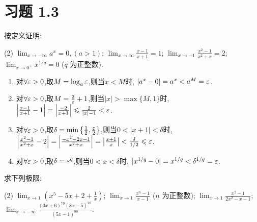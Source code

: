 \section*{习题 1.3}

\begin{exercise}[1.3.1]\label{exe:1.3.1}
    按定义证明:
    \begin{tasks}[label=(\arabic*)](2)
        \task $\lim_{x \to -\infty} a^x = 0, (a > 1)$;
        \task $\lim_{x \to \infty} \frac{x-1}{x+1} = 1$;
        \task $\lim_{x \to -1} \frac{x^2-1}{x^2+x} = 2$;
        \task $\lim_{x \to 0^+} x^{1/q} = 0$ ($q$ 为正整数).
    \end{tasks}
\end{exercise}

\begin{solution}
    \begin{enumerate}[(1)]
        \item 对$\forall \varepsilon > 0$,取$M = \log_a \varepsilon$,则当$x < M$时, $|a^x - 0| = a^x < a^M = \varepsilon$.
        \item 对$\forall \varepsilon > 0$,取$M = \frac{2}{\varepsilon}+1$,则当$|x| > \max\{M,1\}$时, $\left| \frac{x-1}{x+1} - 1 \right| = \left| \frac{-2}{x+1} \right| \leqslant \frac{2}{|x|-1} <  \varepsilon$.
        \item 对$\forall \varepsilon > 0$,取$\delta = \min \left\{ \frac{1}{2}, \frac{\varepsilon}{2} \right\}$,则当$0<|x+1| < \delta$时, $\left| \frac{x^2-1}{x^2+x} - 2 \right| = \left| \frac{-x^2 - 2x - 1}{x^2 + x} \right| = \left| \frac{x+1}{x} \right| < \frac{\delta}{1 / 2} \leqslant  \varepsilon$.
        \item 对$\forall \varepsilon > 0$,取$\delta = \varepsilon^q$,则当$0 < x < \delta$时, $|x^{1/q} - 0| = x^{1/q} < \delta^{1/q} = \varepsilon$.
    \end{enumerate}
\end{solution}

\begin{exercise}[1.3.2]
    求下列极限:
    \begin{tasks}[label=(\arabic*)](2)
        \task $\lim_{x \to 1} \left(x^5 - 5x + 2 + \frac{1}{x}\right)$;
        \task $\lim_{x \to 1} \frac{x^n - 1}{x - 1}$ ($n$ 为正整数);
        \task $\lim_{x \to 1} \frac{x^2-1}{2x^2-x-1}$;
        \task $\lim_{x \to -\infty} \frac{(3x+6)^{70}(8x-5)^{20}}{(5x-1)^{90}}$.
    \end{tasks}
\end{exercise}

